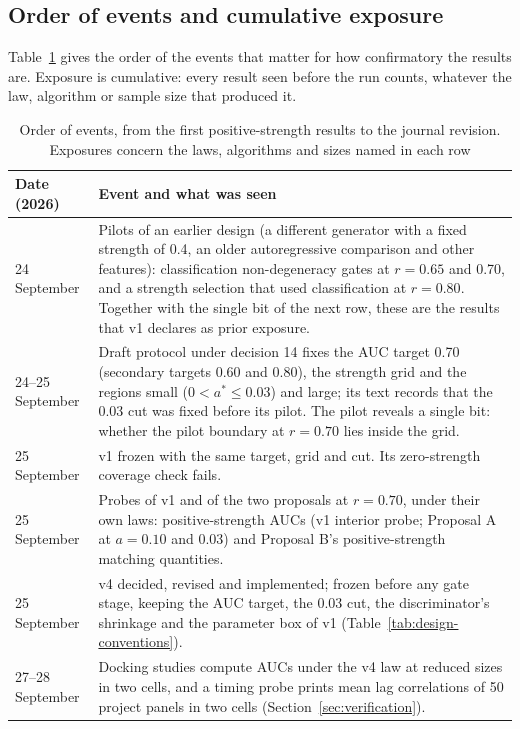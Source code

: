 \subsection{Order of events and cumulative exposure}\label{sec:record-exposure}

Table~\ref{tab:record-events} gives the order of the events that matter for how confirmatory the results are. Exposure is cumulative: every result seen before the run counts, whatever the law, algorithm or sample size that produced it. %

\begin{table}[htbp]
\caption{Order of events, from the first positive-strength results to the journal revision. Exposures concern the laws, algorithms and sizes named in each row}\label{tab:record-events}
\centering\footnotesize
\begin{tabular}{@{}p{}p{}@{}}
\toprule
Date (2026) & Event and what was seen \\
\midrule
24 September & Pilots of an earlier design (a different generator with a fixed strength of 0.4, an older autoregressive comparison and other features): classification non-degeneracy gates at $r=0.65$ and 0.70, and a strength selection that used classification at $r=0.80$. Together with the single bit of the next row, these are the results that v1 declares as prior exposure. \\
24--25 September & Draft protocol under decision 14 fixes the AUC target 0.70 (secondary targets 0.60 and 0.80), the strength grid and the regions small ($0<a^*\le0.03$) and large; its text records that the 0.03 cut was fixed before its pilot. The pilot reveals a single bit: whether the pilot boundary at $r=0.70$ lies inside the grid. \\
25 September & v1 frozen with the same target, grid and cut. Its zero-strength coverage check fails. \\
25 September & Probes of v1 and of the two proposals at $r=0.70$, under their own laws: positive-strength AUCs (v1 interior probe; Proposal A at $a=0.10$ and 0.03) and Proposal B's positive-strength matching quantities. \\
25 September & v4 decided, revised and implemented; frozen before any gate stage, keeping the AUC target, the 0.03 cut, the discriminator's shrinkage and the parameter box of v1 (Table~\ref{tab:design-conventions}). \\
27--28 September & Docking studies compute AUCs under the v4 law at reduced sizes in two cells, and a timing probe prints mean lag correlations of 50 project panels in two cells (Section~\ref{sec:verification}). \\

\end{tabular}
\end{table}
